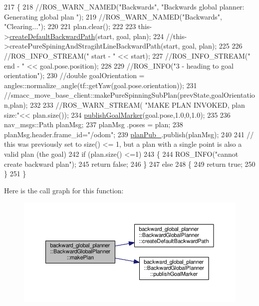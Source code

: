 \begin{DoxyCode}
217 \{
218     \textcolor{comment}{//ROS\_WARN\_NAMED("Backwards", "Backwards global planner: Generating global plan ");}
219     \textcolor{comment}{//ROS\_WARN\_NAMED("Backwards", "Clearing...");}
220 
221     plan.clear();
222 
223     this->\hyperlink{classbackward__global__planner_1_1BackwardGlobalPlanner_a625dba5902c088241ab25c9fb628fd04}{createDefaultBackwardPath}(start, goal, plan);
224     \textcolor{comment}{//this->createPureSpiningAndStragihtLineBackwardPath(start, goal, plan);}
225 
226     \textcolor{comment}{//ROS\_INFO\_STREAM(" start - " << start);}
227     \textcolor{comment}{//ROS\_INFO\_STREAM(" end - " << goal.pose.position);}
228      
229     \textcolor{comment}{//ROS\_INFO("3 - heading to goal orientation");}
230     \textcolor{comment}{//double goalOrientation = angles::normalize\_angle(tf::getYaw(goal.pose.orientation));}
231     \textcolor{comment}{//smacc\_move\_base\_client::makePureSpinningSubPlan(prevState,goalOrientation,plan);}
232 
233     \textcolor{comment}{//ROS\_WARN\_STREAM( "MAKE PLAN INVOKED, plan size:"<< plan.size());}
234     \hyperlink{classbackward__global__planner_1_1BackwardGlobalPlanner_af1211f3b9a8d1c35bb4ba3e17c7758e9}{publishGoalMarker}(goal.pose,1.0,0,1.0);
235 
236     nav\_msgs::Path planMsg;
237     planMsg .poses = plan;
238     planMsg.header.frame\_id=\textcolor{stringliteral}{"/odom"};
239     \hyperlink{classbackward__global__planner_1_1BackwardGlobalPlanner_ad51fd6aecf673a500ec828b796d68228}{planPub\_}.publish(planMsg);
240 
241     \textcolor{comment}{// this was previously set to size() <= 1, but a plan with a single point is also a valid plan (the
       goal)}
242     \textcolor{keywordflow}{if} (plan.size() <=1)
243     \{
244         ROS\_INFO(\textcolor{stringliteral}{"cannot create backward plan"});
245         \textcolor{keywordflow}{return} \textcolor{keyword}{false};
246     \}
247     \textcolor{keywordflow}{else}
248     \{
249         \textcolor{keywordflow}{return} \textcolor{keyword}{true};
250     \}
251 \}
\end{DoxyCode}


Here is the call graph for this function\+:
\nopagebreak
\begin{figure}[H]
\begin{center}
\leavevmode
\includegraphics[width=350pt]{classbackward__global__planner_1_1BackwardGlobalPlanner_a39f2e0d5090f0776942d7cd68eecbde1_cgraph}
\end{center}
\end{figure}




